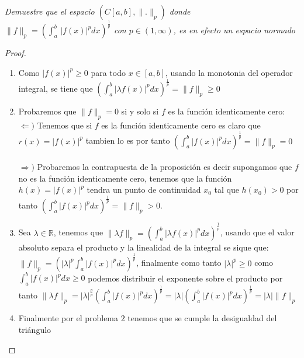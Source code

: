 \documentclass[11pt,letterpaper]{article}
\newcommand{\R}{\mathbb{R}}
\begin{document}
\begin{tcolorbox}[
	title = \textcolor{black}{\textcolor{white}{Problema 3}},]
\textit{Demuestre que el espacio $(C[a,b],\|.\|_p)$ donde $\|f\|_p=\left(\int_{a}^{b}\,|f(x)|^pdx\right)^{\frac{1}{p}}$ con $p\in(1,\infty)$, es en efecto un espacio normado
}
\end{tcolorbox}
\begin{proof}\,\\
	\begin{enumerate}
		\item Como $|f(x)|^p\geq 0$ para todo $x\in [a,b]$, usando la monotonia del operador integral, se tiene que $\left(\int_{a}^{b}|\lambda f(x)|^pdx\right)^\frac{1}{p}=\|f\|_p\geq 0$
		\item Probaremos que $\|f\|_p=0$ si y solo si $f$ es la funci\'on identicamente cero:\,\\
		$\Leftarrow)$ Tenemos que si $f$ es la funci\'on identicamente cero es claro que $r(x)=|f(x)|^p$ tambien lo es por tanto $\left(\int_{a}^{b}|f(x)|^pdx\right)^\frac{1}{p}=\|f\|_p=0$\,\\
		\,\\
		$\Rightarrow)$ Probaremos la contrapuesta de la proposici\'on es decir supongamos que $f$ no es la funci\'on identicamente cero, tenemos que la funci\'on $h(x)=|f(x)|^p$ tendra un punto de continuidad $x_0$ tal que $h(x_0)>0$ por tanto $\left(\int_{a}^{b}|f(x)|^pdx\right)^\frac{1}{p}=\|f\|_p>0$.
		\item Sea $\lambda\in \R$, tenemos que $\|\lambda f\|_p=\left(\int_{a}^{b}|\lambda f(x)|^pdx\right)^\frac{1}{p}$, usando que el valor absoluto separa el producto y la linealidad de la integral se sique que:
		$\|f\|_p=\left(|\lambda|^p\int_{a}^{b}|f(x)|^pdx\right)^\frac{1}{p}$, finalmente como tanto $|\lambda|^p\geq0$ como $\int_{a}^{b}|f(x)|^pdx\geq0$ podemos distribuir el exponente sobre el producto por tanto $\|\lambda f\|_p=|\lambda|^\frac{p}{p}\left(\int_{a}^{b}|f(x)|^pdx\right)^\frac{1}{p}=|\lambda|\left(\int_{a}^{b}|f(x)|^pdx\right)^\frac{1}{p}=|\lambda|\|f\|_p$
		\item Finalmente por el problema $2$ tenemos que se cumple la desigualdad del tri\'angulo
	\end{enumerate}
\end{proof}
\end{document}
